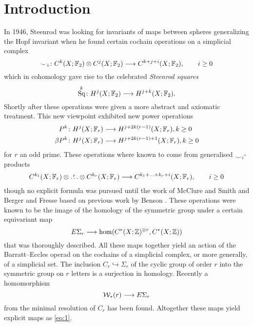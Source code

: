 
\section{Introduction} \label{s:introduction}

In 1946, Steenrod was looking for invariants of maps between spheres generalizing the Hopf invariant when he found certain cochain operations on a simplicial complex 
\[\smile_i\colon C^k(X;\mathbb{F}_2)\otimes C^j(X;\mathbb{F}_2)\longrightarrow C^{k+j+i}(X;\mathbb{F}_2),\qquad i\geq 0\]
which in cohomology gave rise to the celebrated \emph{Steenrod squares}
\[\operatorname*{Sq}^{k}\colon H^j(X;\mathbb{F}_2)\longrightarrow H^{j+k}(X;\mathbb{F}_2).\]
Shortly after these operations were given a more abstract and axiomatic treatment. This new viewpoint exhibited new power operations
\begin{align*}
P^k\colon H^j(X;\mathbb{F}_r)&\longrightarrow H^{j+2k(r-1)}(X;\mathbb{F}_r), k\geq 0 \\
\beta P^k\colon H^j(X;\mathbb{F}_r)&\longrightarrow H^{j+2k(r-1)+1}(X;\mathbb{F}_r), k\geq 0
\end{align*}
for $r$ an odd prime. These operations where known to come from generalised $\smile_i$-products
\begin{align}\label{eq:1}
C^{k_1}(X;\mathbb{F}_r)\otimes\overset{r}{\ldots}\otimes C^{k_r}(X;\mathbb{F}_r)\longrightarrow C^{k_1+\ldots +k_r + i}(X;\mathbb{F}_r),\qquad i\geq 0
\end{align}
though no explicit formula was pursued until the work of McClure and Smith \cite{MS02} and Berger and Fresse \cite{BF03} based on previous work by Benson \cite{Benson}. These operations were known to be the image of the homology of the symmetric group under a certain equivariant map 
\[E\Sigma_r\longrightarrow \hom(C^*(X;\mathbb{Z})^{\otimes r},C^*(X;\mathbb{Z}))\]
that was thoroughly described. All these maps together yield an action of the Barratt--Eccles operad on the cochains of a simplicial complex, or more generally, of a simplicial set. The inclusion $C_r\hookrightarrow \Sigma_r$ of the cyclic group of order $r$ into the symmetric group on $r$ letters is a surjection in homology. Recently \cite{Anibaletal} a homomorphism
\[\mathcal{W}_*(r)\longrightarrow E\Sigma_r\]
from the minimal resolution of $C_r$ has been found. Altogether these maps yield explicit maps as \eqref{eq:1}.

